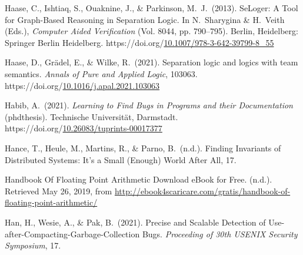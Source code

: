 \documentclass[12pt,twoside]{article}
\begin{document}
{\begin{thebibliography}{1079}
\mdbibitemlabel{}Haase, C., Ishtiaq, S., Ouaknine, J., \& Parkinson, M.~J.~(2013). SeLoger: A Tool for Graph-Based Reasoning in Separation Logic. In N.~Sharygina \& H.~Veith (Eds.), \emph{Computer Aided Verification} (Vol. 8044, pp. 790–795). Berlin, Heidelberg: Springer Berlin Heidelberg. https://doi.org/\href{https://dx.doi.org/10.1007/978-3-642-39799-8_55}{10.1007/978-3-642-39799-8\_55}%

\mdbibitemlabel{}Haase, D., Grädel, E., \& Wilke, R.~(2021). Separation logic and logics with team semantics. \emph{Annals of Pure and Applied Logic}, 103063. https://doi.org/\href{https://dx.doi.org/10.1016/j.apal.2021.103063}{10.1016/j.apal.2021.103063}%

\mdbibitemlabel{}Habib, A.~(2021). \emph{Learning to Find Bugs in Programs and their Documentation} (phdthesis). Technische Universität, Darmstadt. https://doi.org/\href{https://dx.doi.org/10.26083/tuprints-00017377}{10.26083/tuprints-00017377}%

\mdbibitemlabel{}Hance, T., Heule, M., Martins, R., \& Parno, B.~(n.d.). Finding Invariants of Distributed Systems: It’s a Small (Enough) World After All, 17.%

\mdbibitemlabel{}Handbook Of Floating Point Arithmetic Download eBook for Free. (n.d.). Retrieved May 26, 2019, from \href{http://ebook4scaricare.com/gratis/handbook-of-floating-point-arithmetic/}{{\ttfamily http://\hspace{0pt}ebook4scaricare.\hspace{0pt}com/\hspace{0pt}gratis/\hspace{0pt}handbook-\hspace{0pt}of-\hspace{0pt}floating-\hspace{0pt}point-\hspace{0pt}arithmetic/\hspace{0pt}}}%

\mdbibitemlabel{}Han, H., Wesie, A., \& Pak, B.~(2021). Precise and Scalable Detection of Use-after-Compacting-Garbage-Collection Bugs. \emph{Proceeding of 30th USENIX Security Symposium}, 17.%


\end{thebibliography}}
\end{document}
